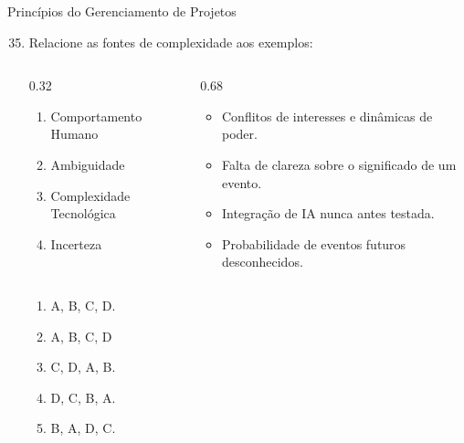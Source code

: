 \documentclass{beamer}
\begin{document}
\begin{frame}{Princípios do Gerenciamento de Projetos}
	\begin{enumerate}
		\setcounter{enumi}{34}
		\justifying
		\item Relacione as fontes de complexidade aos exemplos:
		\begin{columns}
			\begin{column}{0.32\textwidth}
				\begin{enumerate}[A]
					\item Comportamento Humano
					\item Ambiguidade
					\item Complexidade Tecnológica
					\item Incerteza
				\end{enumerate}
			\end{column}
			\begin{column}{0.68\textwidth}
				\begin{itemize}
					\item Conflitos de interesses e dinâmicas de poder.
					\item Falta de clareza sobre o significado de um evento.
					\item Integração de IA nunca antes testada.
					\item Probabilidade de eventos futuros desconhecidos.
				\end{itemize}
			\end{column}
		\end{columns}
		\begin{enumerate}[a]
			\item A, B, C, D.
			\item \alert<2>{A, B, C, D}
			\item C, D, A, B.
			\item D, C, B, A.
			\item B, A, D, C.
		\end{enumerate}
	\end{enumerate}
\end{frame}
\end{document}
